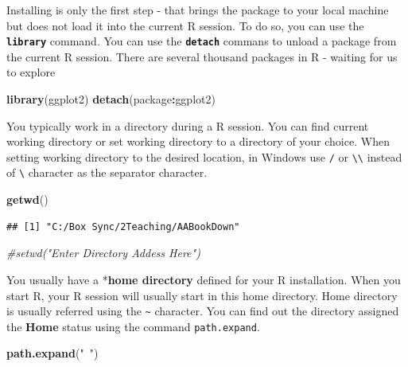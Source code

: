 \documentclass[]{krantz}
\makeatletter
\newenvironment{Shaded}{\begin{snugshade}}{\end{snugshade}}
\newcommand{\KeywordTok}[1]{\textcolor[rgb]{0.27,0.27,0.27}{\textbf{#1}}}
\newcommand{\StringTok}[1]{\textcolor[rgb]{0.5,0.5,0.5}{#1}}
\newcommand{\CommentTok}[1]{\textcolor[rgb]{0.37,0.37,0.37}{\textit{#1}}}
\newcommand{\OperatorTok}[1]{\textcolor[rgb]{0.43,0.43,0.43}{\textbf{#1}}}
\newcommand{\NormalTok}[1]{#1}
\newenvironment{kframe}{%
\medskip{}
\setlength{\fboxsep}{.8em}
 \def\at@end@of@kframe{}%
 \ifinner\ifhmode%
  \def\at@end@of@kframe{\end{minipage}}%
  \begin{minipage}{\columnwidth}%
 \fi\fi%
 \def\FrameCommand##1{\hskip\@totalleftmargin \hskip-\fboxsep
 \colorbox{shadecolor}{##1}\hskip-\fboxsep
     \hskip-\linewidth \hskip-\@totalleftmargin \hskip\columnwidth}%
 \MakeFramed {\advance\hsize-\width
   \@totalleftmargin\z@ \linewidth\hsize
   \@setminipage}}%
 {\par\unskip\endMakeFramed%
 \at@end@of@kframe}
\renewenvironment{Shaded}{\begin{kframe}}{\end{kframe}}
\makeatother
\begin{document}
Installing is only the first step - that brings the package to your
local machine but does not load it into the current R session. To do so,
you can use the \textbf{\texttt{library}} command. You can use the
\textbf{\texttt{detach}} commans to unload a package from the current R
session. There are several thousand packages in R - waiting for us to
explore

\begin{Shaded}
\begin{Highlighting}[]
\KeywordTok{library}\NormalTok{(ggplot2)}
\KeywordTok{detach}\NormalTok{(package}\OperatorTok{:}\NormalTok{ggplot2)}
\end{Highlighting}
\end{Shaded}

You typically work in a directory during a R session. You can find
current working directory or set working directory to a directory of
your choice. When setting working directory to the desired location, in
Windows use \texttt{/} or \texttt{\textbackslash{}\textbackslash{}}
instead of \texttt{\textbackslash{}} character as the separator
character.

\begin{Shaded}
\begin{Highlighting}[]
\KeywordTok{getwd}\NormalTok{()}
\end{Highlighting}
\end{Shaded}

\begin{verbatim}
## [1] "C:/Box Sync/2Teaching/AABookDown"
\end{verbatim}

\begin{Shaded}
\begin{Highlighting}[]
\CommentTok{#setwd("Enter Directory Addess Here")}
\end{Highlighting}
\end{Shaded}

You usually have a *\textbf{home directory} defined for your R
installation. When you start R, your R session will usually start in
this home directory. Home directory is usually referred using the
\texttt{\textasciitilde{}} character. You can find out the directory
assigned the \textbf{Home} status using the command
\texttt{path.expand}.

\begin{Shaded}
\begin{Highlighting}[]
\KeywordTok{path.expand}\NormalTok{(}\StringTok{"~"}\NormalTok{)}
\end{Highlighting}
\end{Shaded}
\end{document}
